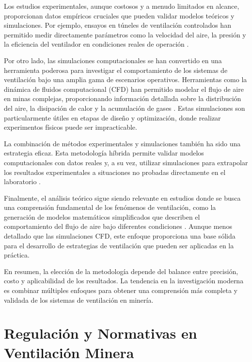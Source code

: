 Los estudios experimentales, aunque costosos y a menudo limitados en alcance, proporcionan datos empíricos cruciales que pueden validar modelos teóricos y simulaciones. Por ejemplo, ensayos en túneles de ventilación controlados han permitido medir directamente parámetros como la velocidad del aire, la presión y la eficiencia del ventilador en condiciones reales de operación \cite{wallace2012experimental}.

Por otro lado, las simulaciones computacionales se han convertido en una herramienta poderosa para investigar el comportamiento de los sistemas de ventilación bajo una amplia gama de escenarios operativos. Herramientas como la dinámica de fluidos computacional (CFD) han permitido modelar el flujo de aire en minas complejas, proporcionando información detallada sobre la distribución del aire, la disipación de calor y la acumulación de gases \cite{tian2017cfd}. Estas simulaciones son particularmente útiles en etapas de diseño y optimización, donde realizar experimentos físicos puede ser impracticable.

La combinación de métodos experimentales y simulaciones también ha sido una estrategia eficaz. Esta metodología híbrida permite validar modelos computacionales con datos reales y, a su vez, utilizar simulaciones para extrapolar los resultados experimentales a situaciones no probadas directamente en el laboratorio \cite{du2018hybrid}.

Finalmente, el análisis teórico sigue siendo relevante en estudios donde se busca una comprensión fundamental de los fenómenos de ventilación, como la generación de modelos matemáticos simplificados que describen el comportamiento del flujo de aire bajo diferentes condiciones \cite{parkinson2015theoretical}. Aunque menos detallado que las simulaciones CFD, este enfoque proporciona una base sólida para el desarrollo de estrategias de ventilación que pueden ser aplicadas en la práctica.

En resumen, la elección de la metodología depende del balance entre precisión, costo y aplicabilidad de los resultados. La tendencia en la investigación moderna es combinar múltiples enfoques para obtener una comprensión más completa y validada de los sistemas de ventilación en minería.



\section{Regulación y Normativas en Ventilación Minera}

